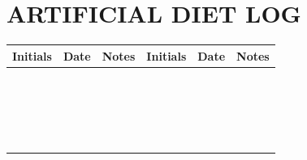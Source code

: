 \documentclass{sop_class}[overrideChapters] %
\begin{document}
{\section{ARTIFICIAL DIET LOG}\label{diet-log}
\begin{table}[!htbp]
    \centering
    \setlength{\tabcolsep}{1em}
      \begin{threeparttable}
              \begin{tabular}{|l|l|l|l|l|l|}
            \hline
            {Initials} & {Date} & {Notes} & {Initials} & {Date} & {Notes}\\
            \hline
            {} & {} & {} & {} & {} & {}\\
            \hline
            {} & {} & {} & {} & {} & {}\\
            \hline
            {} & {} & {} & {} & {} & {}\\
            \hline
            {} & {} & {} & {} & {} & {}\\
            \hline
            {} & {} & {} & {} & {} & {}\\
            \hline
            {} & {} & {} & {} & {} & {}\\
            \hline
            {} & {} & {} & {} & {} & {}\\
            \hline
            {} & {} & {} & {} & {} & {}\\
            \hline
            {} & {} & {} & {} & {} & {}\\
            \hline
            {} & {} & {} & {} & {} & {}\\
            \hline
            {} & {} & {} & {} & {} & {}\\
            \hline
            {} & {} & {} & {} & {} & {}\\
            \hline
            {} & {} & {} & {} & {} & {}\\
            \hline
            {} & {} & {} & {} & {} & {}\\
            \hline
            {} & {} & {} & {} & {} & {}\\
            \hline
            {} & {} & {} & {} & {} & {}\\
            \hline
            {} & {} & {} & {} & {} & {}\\
            \hline
            {} & {} & {} & {} & {} & {}\\
            \hline
            {} & {} & {} & {} & {} & {}\\
            \hline
            {} & {} & {} & {} & {} & {}\\

\end{tabular}
\end{threeparttable}
\end{table}}
\end{document}
